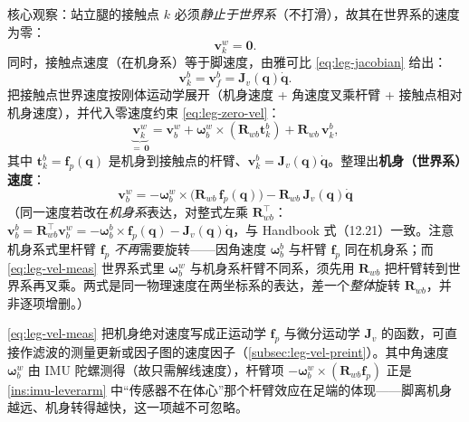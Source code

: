 \begin{derivation}[由零速度约束得机身速度]
核心观察：站立腿的接触点 $k$ 必须\emph{静止于世界系}（不打滑），故其在世界系的速度为零：
\begin{equation}
  \mathbf{v}_k^w=\mathbf{0}.
  \label{eq:leg-zero-vel}
\end{equation}
同时，接触点速度（在机身系）等于脚速度，由雅可比 \cref{eq:leg-jacobian} 给出：
\begin{equation}
  \mathbf{v}_k^b=\mathbf{v}_f^b=\mathbf{J}_v(\mathbf{q})\dot{\mathbf{q}}.
  \label{eq:leg-vk-body}
\end{equation}
把接触点世界速度按刚体运动学展开（机身速度 + 角速度叉乘杆臂 + 接触点相对机身速度），并代入零速度约束 \cref{eq:leg-zero-vel}：
\[
  \underbrace{\mathbf{v}_k^w}_{=\,\mathbf{0}}=\mathbf{v}_b^w+\boldsymbol{\omega}_b^w\times(\mathbf{R}_{wb}\mathbf{t}_k^b)+\mathbf{R}_{wb}\,\mathbf{v}_k^b,
\]
其中 $\mathbf{t}_k^b=\mathbf{f}_p(\mathbf{q})$ 是机身到接触点的杆臂、$\mathbf{v}_k^b=\mathbf{J}_v(\mathbf{q})\dot{\mathbf{q}}$。整理出\textbf{机身（世界系）速度}：
\begin{equation}
  \boxed{\;\mathbf{v}_b^w=-\boldsymbol{\omega}_b^w\times\big(\mathbf{R}_{wb}\,\mathbf{f}_p(\mathbf{q})\big)-\mathbf{R}_{wb}\,\mathbf{J}_v(\mathbf{q})\dot{\mathbf{q}}\;}
  \label{eq:leg-vel-meas}
\end{equation}
（同一速度若改在\emph{机身系}表达，对整式左乘 $\mathbf{R}_{wb}^\top$：$\mathbf{v}_b^b=\mathbf{R}_{wb}^\top\mathbf{v}_b^w=-\boldsymbol{\omega}_b^b\times\mathbf{f}_p(\mathbf{q})-\mathbf{J}_v(\mathbf{q})\dot{\mathbf{q}}$，与 Handbook 式（12.21）一致。注意机身系式里杆臂 $\mathbf{f}_p$ \emph{不再}需要旋转——因角速度 $\boldsymbol{\omega}_b^b$ 与杆臂 $\mathbf{f}_p$ 同在机身系；而 \cref{eq:leg-vel-meas} 世界系式里 $\boldsymbol{\omega}_b^w$ 与机身系杆臂不同系，须先用 $\mathbf{R}_{wb}$ 把杆臂转到世界系再叉乘。两式是同一物理速度在两坐标系的表达，差一个\emph{整体}旋转 $\mathbf{R}_{wb}$，并非逐项增删。）
\end{derivation}

\cref{eq:leg-vel-meas} 把机身绝对速度写成正运动学 $\mathbf{f}_p$ 与微分运动学 $\mathbf{J}_v$ 的函数，可直接作滤波的测量更新或因子图的速度因子（\cref{subsec:leg-vel-preint}）。其中角速度 $\boldsymbol{\omega}_b^w$ 由 IMU 陀螺测得（故只需解线速度），杆臂项 $-\boldsymbol{\omega}_b^w\times(\mathbf{R}_{wb}\mathbf{f}_p)$ 正是 \cref{ins:imu-leverarm} 中“传感器不在体心”那个杆臂效应在足端的体现——脚离机身越远、机身转得越快，这一项越不可忽略。

